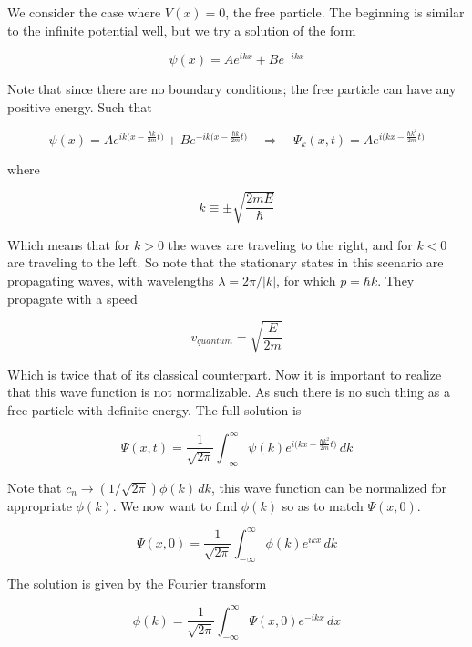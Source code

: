 \documentclass[a4paper]{article}
\begin{document}
We consider the case where $V(x)=0$, the free particle. The beginning is similar to the infinite potential well, but we try a solution of the form

\begin{equation}
	\psi(x)=Ae^{ikx}+Be^{-ikx}
\end{equation}

Note that since there are no boundary conditions; the free particle can have any positive energy. Such that

\begin{equation}
\psi(x)=Ae^{ik\big(x-\frac{\hbar k}{2m}t\big)}+Be^{-ik\big(x-\frac{\hbar k}{2m}t\big)}\quad\Rightarrow\quad \Psi_k(x,t)=Ae^{i\big(kx-\frac{\hbar k^2}{2m}t\big)}
\end{equation}

where

\begin{equation}
	k\equiv\pm\sqrt{\frac{2mE}{\hbar}}
\end{equation}

Which means that for $k>0$ the waves are traveling to the right, and for $k<0$ are traveling to the left. So note that the stationary states in this scenario are propagating waves, with wavelengths $\lambda=2\pi/|k|$, for which $p=\hbar k$. They propagate with a speed 

\begin{equation}
	v_{quantum}=\sqrt{\frac{E}{2m}}
\end{equation}

Which is twice that of its classical counterpart. Now it is important to realize that this wave function is not normalizable. As such there is no such thing as a free particle with definite energy. The full solution is

\begin{equation}
	\Psi(x,t)=\frac{1}{\sqrt{2\pi}}\int_{-\infty}^{\infty}\psi(k)e^{i\big(kx-\frac{\hbar k^2}{2m}t\big)}\,dk
\end{equation}

Note that $c_n\rightarrow (1/\sqrt{2\pi})\phi(k)\,dk$, this wave function can be normalized for appropriate $\phi(k)$. We now want to find $\phi(k)$ so as to match $\Psi(x,0)$.

\begin{equation}
	\Psi(x,0)=\frac{1}{\sqrt{2\pi}}\int_{-\infty}^{\infty}\phi(k)e^{ikx}\,dk
\end{equation}

The solution is given by the Fourier transform

\begin{equation}
	\phi(k)=\frac{1}{\sqrt{2\pi}}\int_{-\infty}^{\infty}\Psi(x,0)e^{-ikx}\,dx
\end{equation}
\end{document}
